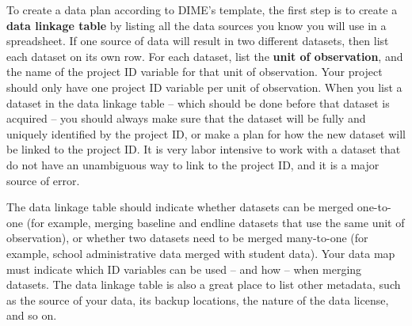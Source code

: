 To create a data plan according to DIME's template,
the first step is to create a \textbf{data linkage table} by listing
all the data sources you know you will use in a spreadsheet.
If one source of data will result in two different datasets,
then list each dataset on its own row.
For each dataset, list the \textbf{unit of observation},
and the name of the project ID variable for that unit of observation.
Your project should only have one project ID variable per unit of observation.
When you list a dataset in the data linkage table --
which should be done before that dataset is acquired --
you should always make sure that the dataset will
be fully and uniquely identified by the project ID,
or make a plan for how
the new dataset will be linked to the project ID.
It is very labor intensive to work with a dataset that
do not have an unambiguous way to link to the project ID,
and it is a major source of error.

The data linkage table should indicate whether
datasets can be merged one-to-one (for example,
merging baseline and endline datasets
that use the same unit of observation),
or whether two datasets need to be merged many-to-one
(for example, school administrative data merged with student data).
Your data map must indicate which ID variables
can be used -- and how -- when merging datasets.
The data linkage table is also a great place to list other metadata,
such as the source of your data, its backup locations,
the nature of the data license, and so on.

